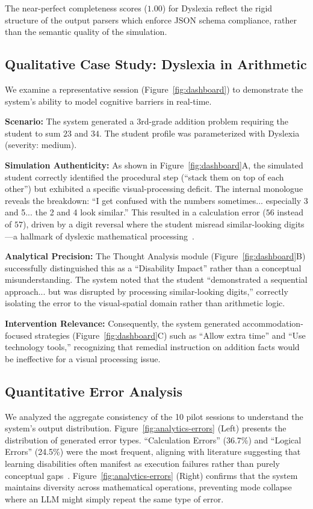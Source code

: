 \documentclass[11pt]{article}
\begin{document}
The near-perfect completeness scores ($1.00$) for Dyslexia reflect the rigid structure of the output parsers which enforce JSON schema compliance, rather than the semantic quality of the simulation.

\subsection{Qualitative Case Study: Dyslexia in Arithmetic}

We examine a representative session (Figure~\ref{fig:dashboard}) to demonstrate the system's ability to model cognitive barriers in real-time.

\textbf{Scenario:} The system generated a 3rd-grade addition problem requiring the student to sum $23$ and $34$. The student profile was parameterized with Dyslexia (severity: medium).

\textbf{Simulation Authenticity:} As shown in Figure~\ref{fig:dashboard}A, the simulated student correctly identified the procedural step (``stack them on top of each other'') but exhibited a specific visual-processing deficit. The internal monologue reveals the breakdown: ``I get confused with the numbers sometimes... especially 3 and 5... the 2 and 4 look similar.'' This resulted in a calculation error ($56$ instead of $57$), driven by a digit reversal where the student misread similar-looking digits---a hallmark of dyslexic mathematical processing~\cite{ref6}.

\textbf{Analytical Precision:} The Thought Analysis module (Figure~\ref{fig:dashboard}B) successfully distinguished this as a ``Disability Impact'' rather than a conceptual misunderstanding. The system noted that the student ``demonstrated a sequential approach... but was disrupted by processing similar-looking digits,'' correctly isolating the error to the visual-spatial domain rather than arithmetic logic.

\textbf{Intervention Relevance:} Consequently, the system generated accommodation-focused strategies (Figure~\ref{fig:dashboard}C) such as ``Allow extra time'' and ``Use technology tools,'' recognizing that remedial instruction on addition facts would be ineffective for a visual processing issue.

\subsection{Quantitative Error Analysis}

We analyzed the aggregate consistency of the 10 pilot sessions to understand the system's output distribution. Figure~\ref{fig:analytics-errors} (Left) presents the distribution of generated error types. ``Calculation Errors'' (36.7\%) and ``Logical Errors'' (24.5\%) were the most frequent, aligning with literature suggesting that learning disabilities often manifest as execution failures rather than purely conceptual gaps~\cite{ref4}. Figure~\ref{fig:analytics-errors} (Right) confirms that the system maintains diversity across mathematical operations, preventing mode collapse where an LLM might simply repeat the same type of error.
\end{document}
